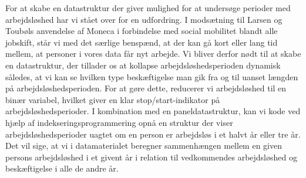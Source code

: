 For at skabe en datastruktur der giver mulighed for at undersøge perioder med arbejdsløshed har vi stået over for en udfordring. I modsætning til Larsen og Toubøls anvendelse af Moneca i forbindelse med social mobilitet blandt alle jobskift, står vi med det særlige benspænd, at der kan gå kort eller lang tid mellem, at personer i vores data får nyt arbejde. Vi bliver derfor nødt til at skabe en datastruktur, der tillader os at kollapse arbejdsløshedsperioden dynamisk således, at vi kan se hvilken type beskæftigelse man gik fra og til uanset længden på arbejdsløshedsperioden. For at gøre dette, reducerer vi arbejdsløshed til en binær variabel, hvilket giver en klar stop/start-indikator på arbejdsløshedsperioder. I kombination med en paneldatastruktur, kan vi kode ved hjælp af indekseringsprogrammering opnå en struktur der viser arbejdsløshedsperioder uagtet om en person er arbejdsløs i et halvt år eller tre år. Det vil sige, at vi i datamaterialet beregner sammenhængen mellem en given persons arbejdsløshed i et givent år i relation til vedkommendes arbejdsløshed og beskæftigelse i alle de andre år.

